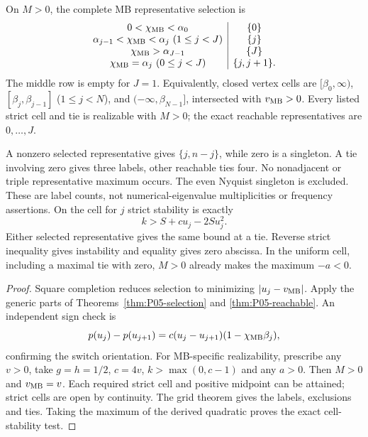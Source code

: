 \begin{theorem}
\label{thm:P08-selection}
On $M>0$, the complete MB representative selection is
\begin{equation}
\begin{array}{c|c}
0<\chi_{\mathrm{MB}}<\alpha_0&\{0\}\\
\alpha_{j-1}<\chi_{\mathrm{MB}}<\alpha_j\ (1\le j<J)&\{j\}\\
\chi_{\mathrm{MB}}>\alpha_{J-1}&\{J\}\\
\chi_{\mathrm{MB}}=\alpha_j\ (0\le j<J)&\{j,j+1\}.
\end{array}\label{eq:P08-cells}
\end{equation}
The middle row is empty for $J=1$. Equivalently, closed vertex cells are
$[\beta_0,\infty)$, $[\beta_j,\beta_{j-1}]$ ($1\le j<N$), and
$(-\infty,\beta_{N-1}]$, intersected with $v_{\mathrm{MB}}>0$.
Every listed strict cell and tie is realizable with $M>0$; the exact
reachable representatives are $0,\ldots,J$.

A nonzero selected representative gives $\{j,n-j\}$, while zero is a
singleton. A tie involving zero gives three labels, other reachable
ties four. No nonadjacent or triple representative maximum occurs.
The even Nyquist singleton is excluded. These are label counts, not
numerical-eigenvalue multiplicities or frequency assertions.
On the cell for $j$ strict stability is exactly
\begin{equation}
 \boxed{k>S+cu_j-2Su_j^2.}\label{eq:P08-cell-stability}
\end{equation}
Either selected representative gives the same bound at a tie.
Reverse strict inequality gives instability and equality gives zero
abscissa. In the uniform cell, including a maximal tie with zero,
$M>0$ already makes the maximum $-a<0$.
\end{theorem}
\begin{proof}
Square completion reduces selection to minimizing $|u_j-v_{\mathrm{MB}}|$.
Apply the generic parts of Theorems~\ref{thm:P05-selection} and
\ref{thm:P05-reachable}. An independent sign check is
\[
 p(u_j)-p(u_{j+1})=c(u_j-u_{j+1})(1-\chi_{\mathrm{MB}}\beta_j),
\]
confirming the switch orientation. For MB-specific realizability,
prescribe any $v>0$, take $g=h=1/2$, $c=4v$,
$k>\max(0,c-1)$ and any $a>0$. Then $M>0$ and $v_{\mathrm{MB}}=v$.
Each required strict cell and positive midpoint can be attained; strict
cells are open by continuity. The grid theorem gives the labels,
exclusions and ties. Taking the maximum of the derived quadratic proves
the exact cell-stability test.
\end{proof}

